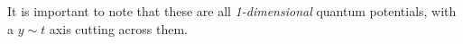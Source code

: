 \documentclass[compress,10pt,usenames,dvipsnames]{beamer}
\theoremstyle{remark}
\begin{document}
\begin{frame}
\begin{figure}
\begin{subfigure}[t]{.25\textwidth}
		\end{subfigure}
	\end{figure}
	\pause\pause
	It is important to note that these are all \emph{1-dimensional} quantum potentials, with a $y\sim t$ axis cutting across them.
\end{frame}
\end{document}
